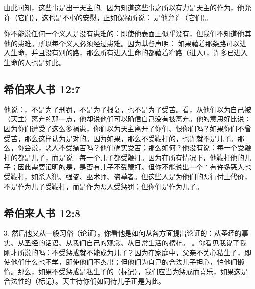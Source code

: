 由此可知，这些事是出于天主的。因为知道这些事之所以有力是天主的作为，他允许（它们），这也是不小的安慰，正如保禄所说： 是他允许（它们）。\par

你不能说任何一个义人是没有患难的：即使他表面上似乎没有，但我们不知道他其他的患难。所以每个义人必须经过患难。因为基督声明： 如果藉着那条路可以进入生命，并且没有别的路，那么所有进入生命的都藉着窄路（进入），许多已进入生命的人也是如此。\par


\subsection{希伯来人书 12:7}

他说：，不是为了刑罚，不是为了报复，也不是为了受苦。看，从他们以为自己被（天主）离弃的那一点，他却说他们可以确信自己没有被离弃。他的意思好比说：因为你们遭受了这么多祸患，你们以为天主离开了你们、恨你们吗？如果你们不曾受苦，那么这样认为是对的。因为如果，那么不受鞭打的，也许就不是儿子。那么，你会说，恶人不受痛苦吗？他们确实受苦；那么如何？他没有说：每一个受鞭打的都是儿子，而是说：每一个儿子都受鞭打。因为在所有情况下，他鞭打他的儿子；因此需要证明的是，是否有儿子不受鞭打。但你不能说出一个：有许多恶人也受鞭打，如杀人犯、强盗、巫术师、盗墓者。但这些人是为他们的恶行付上代价，不是作为儿子受鞭打，而是作为恶人受惩罚；但你们是作为儿子。\par


\subsection{希伯来人书 12:8}

3. 然后他又从一般习俗（论证）。你看他是如何从各方面提出论证的：从圣经的事实、从圣经的话语、从我们自己的观念、从日常生活的榜样。 。你看见我说了我刚才所说的吗：不受惩戒就不能成为儿子？因为在家庭中，父亲不关心私生子，即使他们什么也不学，即使他们不杰出；但他们为自己的合法儿子担心，怕他们懒惰。那么，如果不受惩戒是私生子的（标记），我们应当为惩戒而喜乐，如果这是合法性的（标记）。天主待你们如同待儿子正是为此。\par

